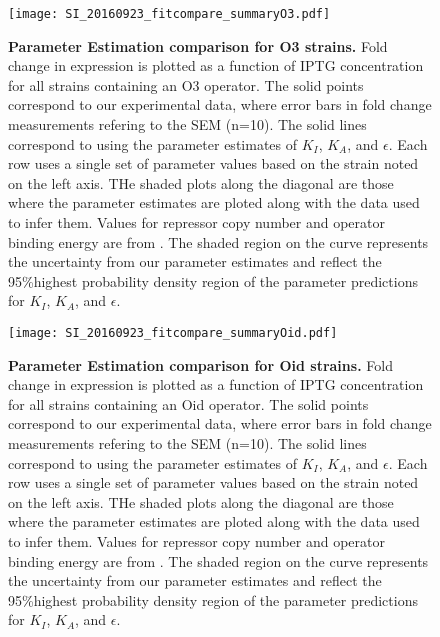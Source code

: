 \begin{figure}[h]
	\centering \texttt{[image: SI\_20160923\_fitcompare\_summaryO3.pdf]} 
	\caption{{\bf Parameter Estimation comparison for O3 strains.} Fold change in expression is plotted as a function of IPTG concentration for all strains containing an O3 operator. The solid points correspond to our experimental data, where error bars in fold change measurements refering to the SEM (n=10). The solid lines correspond to \eref[eq7] using the parameter estimates of $K_I$, $K_A$, and $\epsilon$. Each row uses a single set of parameter values based on the strain noted on the left axis. THe shaded plots along the diagonal are those where the parameter estimates are ploted along with the data used to infer them. Values for repressor copy number and operator binding energy are from \cite{Garcia2011}.  The shaded region on the curve represents the uncertainty from our parameter estimates and reflect the 95\%highest probability density region of the parameter predictions for $K_I$, $K_A$, and $\epsilon$.}
	\label{SIfig9}
\end{figure}

\begin{figure}[h]
	\centering \texttt{[image: SI\_20160923\_fitcompare\_summaryOid.pdf]} 
	\caption{{\bf Parameter Estimation comparison for Oid strains.} Fold change in expression is plotted as a function of IPTG concentration for all strains containing an Oid operator. The solid points correspond to our experimental data, where error bars in fold change measurements refering to the SEM (n=10). The solid lines correspond to \eref[eq7] using the parameter estimates of $K_I$, $K_A$, and $\epsilon$. Each row uses a single set of parameter values based on the strain noted on the left axis. THe shaded plots along the diagonal are those where the parameter estimates are ploted along with the data used to infer them. Values for repressor copy number and operator binding energy are from \cite{Garcia2011}.  The shaded region on the curve represents the uncertainty from our parameter estimates and reflect the 95\%highest probability density region of the parameter predictions for $K_I$, $K_A$, and $\epsilon$.}
	\label{SIfig10}
\end{figure}


